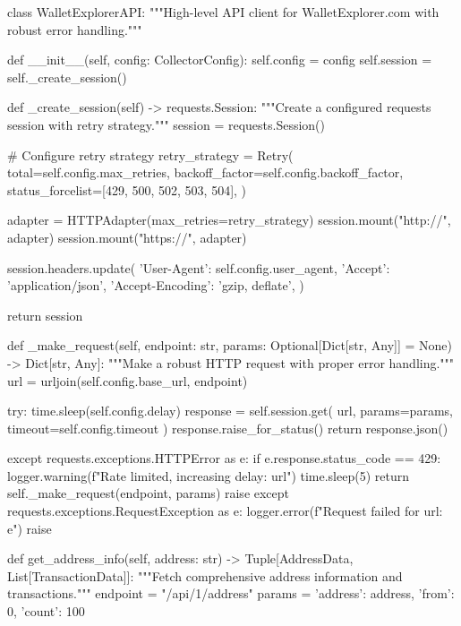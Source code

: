 \begin{codelisting}[language=Python, caption=Основной скрипт сбора данных]
class WalletExplorerAPI:
    """High-level API client for WalletExplorer.com with robust error handling."""
    
    def __init__(self, config: CollectorConfig):
        self.config = config
        self.session = self._create_session()
        
    def _create_session(self) -> requests.Session:
        """Create a configured requests session with retry strategy."""
        session = requests.Session()
        
        # Configure retry strategy
        retry_strategy = Retry(
            total=self.config.max_retries,
            backoff_factor=self.config.backoff_factor,
            status_forcelist=[429, 500, 502, 503, 504],
        )
        
        adapter = HTTPAdapter(max_retries=retry_strategy)
        session.mount("http://", adapter)
        session.mount("https://", adapter)
        
        session.headers.update({
            'User-Agent': self.config.user_agent,
            'Accept': 'application/json',
            'Accept-Encoding': 'gzip, deflate',
        })
        
        return session
    
    def _make_request(self, endpoint: str, params: Optional[Dict[str, Any]] = None) -> Dict[str, Any]:
        """Make a robust HTTP request with proper error handling."""
        url = urljoin(self.config.base_url, endpoint)
        
        try:
            time.sleep(self.config.delay)
            response = self.session.get(
                url, 
                params=params, 
                timeout=self.config.timeout
            )
            response.raise_for_status()
            return response.json()
            
        except requests.exceptions.HTTPError as e:
            if e.response.status_code == 429:
                logger.warning(f"Rate limited, increasing delay: {url}")
                time.sleep(5)
                return self._make_request(endpoint, params)
            raise
        except requests.exceptions.RequestException as e:
            logger.error(f"Request failed for {url}: {e}")
            raise
    
    def get_address_info(self, address: str) -> Tuple[AddressData, List[TransactionData]]:
        """Fetch comprehensive address information and transactions."""
        endpoint = "/api/1/address"
        params = {'address': address, 'from': 0, 'count': 100}
        

\end{codelisting}
